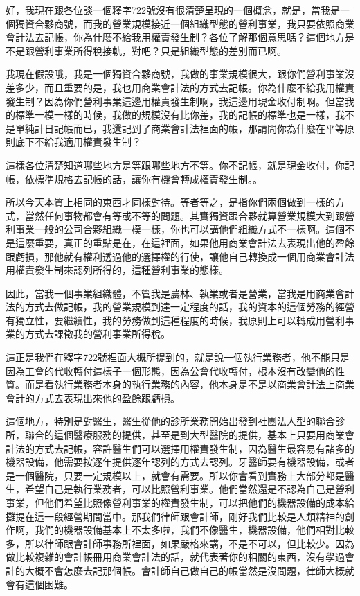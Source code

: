 \documentclass[]{ctexbook}
\begin{document}
好，我現在跟各位談一個釋字722號沒有很清楚呈現的一個概念，就是，當我是一個獨資合夥商號，而我的營業規模接近一個組織型態的營利事業，我只要依照商業會計法去記帳，你為什麼不給我用權責發生制？各位了解那個意思嗎？這個地方是不是跟營利事業所得稅接軌，對吧？只是組織型態的差別而已啊。

我現在假設哦，我是一個獨資合夥商號，我做的事業規模很大，跟你們營利事業沒差多少，而且重要的是，我也用商業會計法的方式去記帳。你為什麼不給我用權責發生制？因為你們營利事業這邊用權責發生制啊，我這邊用現金收付制啊。但當我的標準一模一樣的時候，我做的規模沒有比你差，我的記帳的標準也是一樣，我不是單純計日記帳而已，我還記到了商業會計法裡面的帳，那請問你為什麼在平等原則底下不給我適用權責發生制？

這樣各位清楚知道哪些地方是等跟哪些地方不等。你不記帳，就是現金收付，你記帳，依標準規格去記帳的話，讓你有機會轉成權責發生制。。

所以今天本質上相同的東西才同樣對待。等者等之，是指你們兩個做到一樣的方式，當然任何事物都會有等或不等的問題。其實獨資跟合夥就算營業規模大到跟營利事業一般的公司合夥組織一模一樣，你也可以講他們組織方式不一樣啊。這個不是這麼重要，真正的重點是在，在這裡面，如果他用商業會計法去表現出他的盈餘跟虧損，那他就有權利透過他的選擇權的行使，讓他自己轉換成一個用商業會計法用權責發生制來認列所得的，這種營利事業的態樣。

因此，當我一個事業組織體，不管我是農林、執業或者是營業，當我是用商業會計法的方式去做記帳，我的營業規模到達一定程度的話，我的資本的這個勞務的經營有獨立性，要繼續性，我的勞務做到這種程度的時候，我原則上可以轉成用營利事業的方式去課徵我的營利事業所得稅。

這正是我們在釋字722號裡面大概所提到的，就是說一個執行業務者，他不能只是因為工會的代收轉付這樣子一個形態，因為公會代收轉付，根本沒有改變他的性質。而是看執行業務者本身的執行業務的內容，他本身是不是以商業會計法上商業會計的方式去表現出來他的盈餘跟虧損。

這個地方，特別是對醫生，醫生從他的診所業務開始出發到社團法人型的聯合診所，聯合的這個醫療服務的提供，甚至是到大型醫院的提供，基本上只要用商業會計法的方式去記帳，容許醫生們可以選擇用權責發生制，因為醫生最容易有諸多的機器設備，他需要按逐年提供逐年認列的方式去認列。牙醫師要有機器設備，或者是一個醫院，只要一定規模以上，就會有需要。所以你會看到實務上大部分都是醫生，希望自己是執行業務者，可以比照營利事業。他們當然還是不認為自己是營利事業，但他們希望比照像營利事業的權責發生制，可以把他們的機器設備的成本給攤提在這一段經營期間當中。那我們律師跟會計師，剛好我們比較是人類精神的創作啊，我們的機器設備基本上不太多啦，我們不像醫生，機器設備，他們相對比較多，所以律師跟會計師事務所裡面，如果嚴格來講，不是不可以，但比較少。因為做比較複雜的會計帳冊用商業會計法的話，就代表著你的相關的東西，沒有學過會計的大概不會怎麼去記那個帳。會計師自己做自己的帳當然是沒問題，律師大概就會有這個困難。
\end{document}
